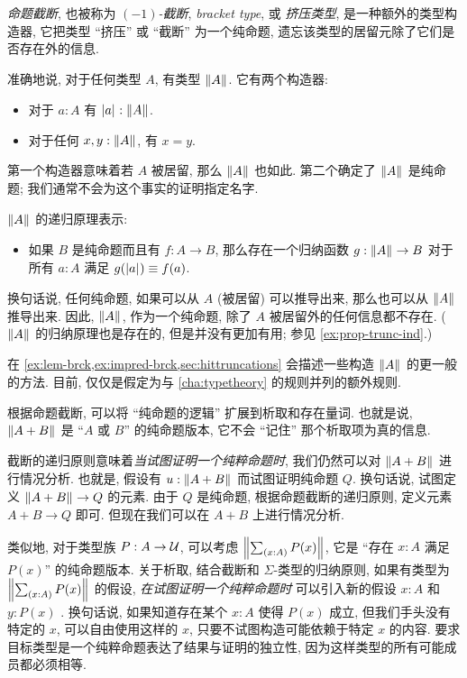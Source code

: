 %
%
%
%
%
\emph{命题截断}, 也被称为 \emph{$(-1)$-截断}, \emph{bracket type}, 或 \emph{挤压类型}, 是一种额外的类型构造器, 它把类型 ``挤压'' 或 ``截断'' 为一个纯命题, 遗忘该类型的居留元除了它们是否存在外的信息.

准确地说, 对于任何类型 $A$, 有类型 $\mathopen{}\left\Vert A\right\Vert_{}\mathclose{}$.
它有两个构造器:
\begin{itemize}
    \item 对于 $a:A$ 有 $\mathopen{}\left|a\right|_{}^{}\mathclose{} : \mathopen{}\left\Vert A\right\Vert_{}\mathclose{}$.
    \item 对于任何 $x,y:\mathopen{}\left\Vert A\right\Vert_{}\mathclose{}$, 有 $x=y$.
\end{itemize}
第一个构造器意味着若 $A$ 被居留, 那么 $\mathopen{}\left\Vert A\right\Vert_{}\mathclose{}$ 也如此.
第二个确定了 $\mathopen{}\left\Vert A\right\Vert_{}\mathclose{}$ 是纯命题; 我们通常不会为这个事实的证明指定名字.

%
$\mathopen{}\left\Vert A\right\Vert_{}\mathclose{}$ 的递归原理表示:
\begin{itemize}
    \item 如果 $B$ 是纯命题而且有 $f:A\to B$, 那么存在一个归纳函数 $g:\mathopen{}\left\Vert A\right\Vert_{}\mathclose{} \to B$ 对于所有 $a:A$ 满足 $g(\mathopen{}\left|a\right|_{}^{}\mathclose{}) \equiv f(a)$.
\end{itemize}
换句话说, 任何纯命题, 如果可以从 $A$ (被居留) 可以推导出来, 那么也可以从 $\mathopen{}\left\Vert A\right\Vert_{}\mathclose{}$ 推导出来.
因此, $\mathopen{}\left\Vert A\right\Vert_{}\mathclose{}$, 作为一个纯命题, 除了 $A$ 被居留外的任何信息都不存在.
($\mathopen{}\left\Vert A\right\Vert_{}\mathclose{}$ 的归纳原理也是存在的, 但是并没有更加有用; 参见 \cref{ex:prop-trunc-ind}.)

在 \cref{ex:lem-brck,ex:impred-brck,sec:hittruncations} 会描述一些构造 $\mathopen{}\left\Vert A\right\Vert_{}\mathclose{}$ 的更一般的方法.
目前, 仅仅是假定为与 \cref{cha:typetheory} 的规则并列的额外规则.

根据命题截断, 可以将 ``纯命题的逻辑'' 扩展到析取和存在量词.
也就是说, $\mathopen{}\left\Vert A+B\right\Vert_{}\mathclose{}$ 是 ``$A$ 或 $B$'' 的纯命题版本, 它不会 ``记住'' 那个析取项为真的信息.

截断的递归原则意味着\emph{当试图证明一个纯粹命题时}, 我们仍然可以对 $\mathopen{}\left\Vert A+B\right\Vert_{}\mathclose{}$ 进行情况分析.
也就是, 假设有 $u:\mathopen{}\left\Vert A+B\right\Vert_{}\mathclose{}$ 而试图证明纯命题 $Q$.
换句话说, 试图定义 $\mathopen{}\left\Vert A+B\right\Vert_{}\mathclose{} \to Q$ 的元素.
由于 $Q$  是纯命题, 根据命题截断的递归原则, 定义元素 $A+B\to Q$ 即可.
但现在我们可以在 $A+B$ 上进行情况分析.

类似地, 对于类型族 $P:A\to\mathcal{U}$, 可以考虑 $\brck{\sm{x:A} P(x)}$, 它是 ``存在 $x:A$ 满足 $P(x)$'' 的纯命题版本.
关于析取, 结合截断和 $\Sigma$-类型的归纳原则, 如果有类型为 $\brck{\sm{x:A} P(x)}$ 的假设, \emph{在试图证明一个纯粹命题时} 可以引入新的假设 $x:A$ 和 $y:P(x)$ .
换句话说, 如果知道存在某个 $x:A$ 使得 $P(x)$ 成立, 但我们手头没有特定的 $x$, 可以自由使用这样的 $x$, 只要不试图构造可能依赖于特定 $x$ 的内容.
要求目标类型是一个纯粹命题表达了结果与证明的独立性, 因为这样类型的所有可能成员都必须相等.

